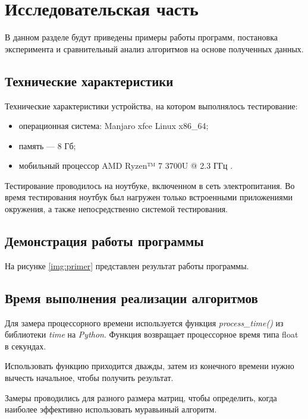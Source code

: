 \chapter{Исследовательская часть}

В данном разделе будут приведены примеры работы программ, постановка эксперимента и сравнительный анализ алгоритмов на основе полученных данных.

\section{Технические характеристики}

Технические характеристики устройства, на котором выполнялось тестирование:

\begin{itemize}
	\item операционная система: Manjaro xfce \cite{ubuntu} Linux \cite{linux} x86\_64;
	\item память --- 8 Гб;
	\item мобильный процессор AMD Ryzen™ 7 3700U @ 2.3 ГГц \cite{intel}.
\end{itemize}

Тестирование проводилось на ноутбуке, включенном в сеть электропитания. Во время тестирования ноутбук был нагружен только встроенными приложениями окружения, а также непосредственно системой тестирования.

\section{Демонстрация работы программы}

На рисунке \ref{img:primer} представлен результат работы программы.

\FloatBarrier

\section{Время выполнения реализации алгоритмов}

Для замера процессорного времени используется функция \textit{process\_time()} из библиотеки \textit{time} на \textit{Python}. Функция возвращает процессорное время типа float в секундах.

Использовать функцию приходится дважды, затем из конечного времени нужно вычесть начальное, чтобы получить результат.

Замеры проводились для разного размера матриц, чтобы определить, когда наиболее эффективно использовать муравьиный алгоритм.

